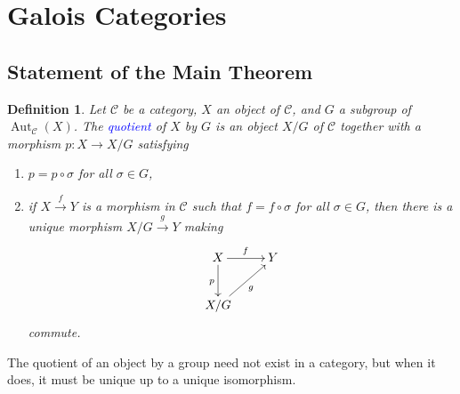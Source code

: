 \documentclass[10pt]{article}
\theoremstyle{thmstyle}
\theoremstyle{defstyle}
\newtheorem{definition}[theorem]{Definition}
\newcommand{\Aut}{\operatorname{Aut}}
\newcommand{\scrC}{\mathscr{C}} %
\newcommand{\define}[1]{\textcolor{blue}{\textit{#1}}}
\begin{document}
\newpage
\section{Galois Categories}

\subsection{Statement of the Main Theorem}

\begin{definition}
    Let $\scrC$ be a category, $X$ an object of $\scrC$, and $G$ a subgroup of $\Aut_{\scrC}(X)$. The \define{quotient} of $X$ by $G$ is an object $X/G$ of $\scrC$ together with a morphism $p: X\to X/G$ satisfying
    \begin{enumerate}[label=(\roman*)]
        \item $p = p\circ\sigma$ for all $\sigma\in G$,
        \item if $X\xrightarrow{f} Y$ is a morphism in $\scrC$ such that $f = f\circ\sigma$ for all $\sigma\in G$, then there is a unique morphism $X/G\xrightarrow{g} Y$ making 
        \begin{equation*}
            \xymatrix {
                X\ar[r]^f\ar[d]_p & Y\\
                X/G\ar[ru]_g
            }
        \end{equation*}
        commute.
    \end{enumerate}
\end{definition}

The quotient of an object by a group need not exist in a category, but when it does, it must be unique up to a unique isomorphism.
\end{document}
